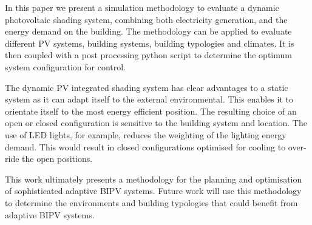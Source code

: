 
In this paper we present a simulation methodology to evaluate a dynamic photovoltaic shading system, combining both electricity generation, and the energy demand on the building. The methodology can be applied to evaluate different PV systems, building systems, building typologies and climates. It is then coupled with a post processing python script to determine the optimum system configuration for control. 

The dynamic PV integrated shading system has clear advantages to a static system as it can adapt itself to the external environmental. This enables it to orientate itself to the most energy efficient position. The resulting choice of an open or closed configuration is sensitive to the building system and location. The use of LED lights, for example, reduces the weighting of the lighting energy demand. This would result in closed configurations optimised for cooling to over-ride the open positions. 

This work ultimately presents a methodology for the planning and optimisation of sophisticated adaptive BIPV systems. Future work will use this methodology to determine the environments and building typologies that could benefit from adaptive BIPV systems. 



